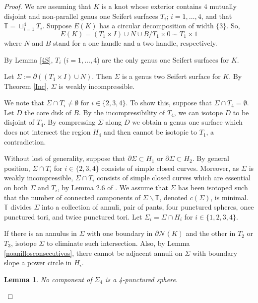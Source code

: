 \documentclass[12pt]{amsart}
\newtheorem{lema}{Lemma}
\begin{document}
\begin{proof}
We are assuming that $K$ is a knot whose exterior contains $4$ mutually disjoint and non-parallel genus one Seifert surfaces $T_{i}$; $i=1,\ldots, 4$, and that $\mathbb{T}=\sqcup_{i=1}^4 T_i$.
Suppose $E(K)$ has a circular decomposition of width $\{3\}$. So, 
$$
E(K)=(T_{1}\times I)\cup N\cup B/ T_{1}\times 0\sim T_{1}\times 1
$$ where $N$ and $B$ stand for a one handle and a two handle, respectively.


By Lemma \ref{4S}, $T_{i}$ ($i=1,\ldots, 4$) are the only genus one Seifert surfaces for $K$. 
 
 Let $\Sigma:=\partial ((T_{1}\times I)\cup N)$. Then  $\Sigma$ is a genus two Seifert surface for $K$. By Theorem \ref{Inc}, $\Sigma$ is weakly incompressible.
 
 We note that $\Sigma\cap T_{i}\neq\emptyset$ for $i\in\{2,3,4\}$. To show this, suppose that  $\Sigma\cap T_{4}=\emptyset$. Let $D$ the core disk of $B$. By the incompressibility of $T_{4}$, we can isotope $D$ to be disjoint of $T_{4}$. By compressing $\Sigma$ along $D$ we obtain a genus one surface which does not intersect the region $H_4$ and then cannot be isotopic to $T_{1}$, a contradiction.
 
 Without lost of generality,  suppose that $\partial\Sigma\subset H_{1}$ or $\partial\Sigma\subset H_{2}$. By general position, $\Sigma\cap T_{i}$ for $i\in\{2,3,4\}$ consists of simple closed curves. Moreover, as $\Sigma$ is weakly incompressible, $\Sigma\cap T_{i}$ consists of simple closed curves which are essential on both $\Sigma$ and $T_{i}$, by Lemma 2.6 of \cite{Sch}. We assume that $\Sigma$ has been isotoped such that the number of connected components of $\Sigma \backslash \mathbb{T}$, denoted $c(\Sigma)$, is minimal.
 $\mathbb{T}$ divides $\Sigma$ into a collection of  annuli, pair of pants, four punctured spheres, once punctured tori, and twice punctured tori. Let $\Sigma_i=\Sigma \cap H_i$ for $i\in\{1,2,3,4\}$.

If there is an annulus in $\Sigma$ with one boundary in $\partial\mathcal{N}(K)$ and the other in $T_{2}$ or $T_3$, isotope $\Sigma$ to eliminate such intersection. Also, by Lemma \ref{noanillosconsecutivos}, there cannot be adjacent annuli on $\Sigma$ with boundary slope a power circle in $H_{i}$.

\begin{lema} No component of $\Sigma_4$ is a 4-punctured sphere.
\end{lema}


\end{proof}
\end{document}
